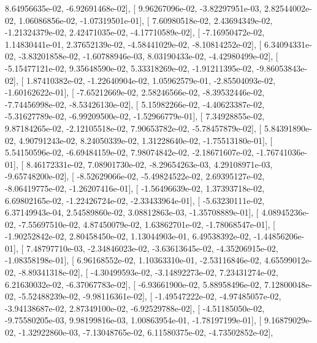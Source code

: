 \documentclass{article}
\begin{document}
          8.64956635e-02,  -6.92691468e-02],
       [  9.96267096e-02,  -3.82297951e-03,   2.82544002e-02,
          1.06086856e-02,  -1.07319501e-01],
       [  7.60980518e-02,   2.43694349e-02,  -1.21324379e-02,
          2.42471035e-02,  -4.17710589e-02],
       [ -7.16950472e-02,   1.14830441e-01,   2.37652139e-02,
         -4.58441029e-02,  -8.10814252e-02],
       [  6.34094331e-02,  -3.83201858e-02,  -1.60788946e-03,
          8.03190433e-02,  -4.42980499e-02],
       [ -5.15477121e-02,   9.35648590e-02,   5.33318269e-02,
         -1.91211395e-02,  -9.86053843e-02],
       [  1.87410382e-02,  -1.22640904e-02,   1.05962579e-01,
         -2.85504093e-02,  -1.60162622e-01],
       [ -7.65212669e-02,   2.58246566e-02,  -8.39532446e-02,
         -7.74456998e-02,  -8.53426130e-02],
       [  5.15982266e-02,  -4.40623387e-02,  -5.31627789e-02,
         -6.99209500e-02,  -1.52966779e-01],
       [  7.34928855e-02,   9.87184265e-02,  -2.12105518e-02,
          7.90653782e-02,  -5.78457879e-02],
       [  5.84391890e-02,   4.90791243e-02,   8.24050339e-02,
          1.31228640e-02,  -1.75513180e-01],
       [  5.54150596e-02,  -6.69484159e-02,   7.98074842e-02,
         -2.18671607e-02,  -1.76741036e-01],
       [  8.46172331e-02,   7.08901730e-02,  -8.29654263e-03,
          4.29108971e-03,  -9.65748200e-02],
       [ -8.52629066e-02,  -5.49824522e-02,   2.69395127e-02,
         -8.06419775e-02,  -1.26207416e-01],
       [ -1.56496639e-02,   1.37393718e-02,   6.69802165e-02,
         -1.22426724e-02,  -2.33433964e-01],
       [ -5.63230111e-02,   6.37149943e-04,   2.54589860e-02,
          3.08812863e-03,  -1.35708889e-01],
       [  4.08945236e-02,  -7.55697510e-02,   4.87450079e-02,
          1.63862701e-02,  -1.78068547e-01],
       [ -1.90252842e-02,   2.80458450e-02,   1.13044903e-01,
          6.49538392e-02,  -1.44856206e-01],
       [  7.48797710e-03,  -2.34846023e-02,  -3.63613645e-02,
         -4.35206915e-02,  -1.08358198e-01],
       [  6.96168552e-02,   1.10363310e-01,  -2.53116846e-02,
          4.65599012e-02,  -8.89341318e-02],
       [ -4.30499593e-02,  -3.14892273e-02,   7.23431274e-02,
          6.21630032e-02,  -6.37067783e-02],
       [ -6.93661900e-02,   5.88958496e-02,   7.12800048e-02,
         -5.52488239e-02,  -9.98116361e-02],
       [ -1.49547222e-02,  -4.97485057e-02,  -3.94138687e-02,
          2.87349100e-02,  -6.92529788e-02],
       [ -4.51185050e-02,  -9.75580205e-03,   9.98199816e-03,
          1.00863954e-01,  -1.78197199e-01],
       [  9.16879029e-02,  -1.32922860e-03,  -7.13048765e-02,
          6.11580375e-02,  -4.73502852e-02],
\end{document}
